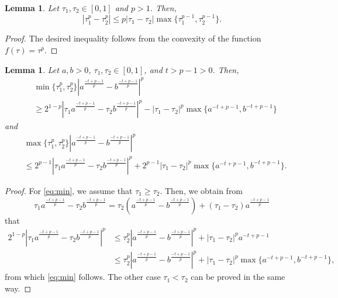 \documentclass[11pt]{amsart}
\theoremstyle{plain}
\newtheorem{lemma}[theorem]{Lemma}
\theoremstyle{definition}
\numberwithin{equation}{section}
\begin{document}
\begin{appendix}
\begin{lemma} \label{lem:ineq3}
Let $\tau_1, \tau_2 \in [0,1]$ and $p > 1$. Then,
\begin{equation*}
|\tau_1^p - \tau_2^p| \leq p |\tau_1-\tau_2| \max\lbrace \tau_1^{p-1},\tau_2^{p-1} \rbrace.
\end{equation*}
\end{lemma}

\begin{proof}
The desired inequality follows from the convexity of the function $f(\tau) = \tau^p$.
\end{proof}

\begin{lemma} \label{lem:ineq4}
Let $a, b > 0$, $\tau_1, \tau_2 \in [0,1]$, and $t > p-1 > 0$. Then,
\begin{equation} \label{eq:min}
\begin{split}
&\min\lbrace \tau_1^p, \tau_2^p \rbrace \left| a^{\frac{-t+p-1}{p}} - b^{\frac{-t+p-1}{p}} \right|^p \\
&\geq 2^{1-p} \left| \tau_1 a^{\frac{-t+p-1}{p}} - \tau_2 b^{\frac{-t+p-1}{p}} \right|^p - |\tau_1-\tau_2|^p \max \lbrace a^{-t+p-1}, b^{-t+p-1} \rbrace
\end{split}
\end{equation}
and
\begin{equation} \label{eq:max}
\begin{split}
&\max\lbrace \tau_1^p, \tau_2^p \rbrace \left| a^{\frac{-t+p-1}{p}} - b^{\frac{-t+p-1}{p}} \right|^p \\
&\leq 2^{p-1} \left| \tau_1 a^{\frac{-t+p-1}{p}} - \tau_2 b^{\frac{-t+p-1}{p}} \right|^p + 2^{p-1} |\tau_1-\tau_2|^p \max \lbrace a^{-t+p-1}, b^{-t+p-1} \rbrace.
\end{split}
\end{equation}
\end{lemma}

\begin{proof}
For \eqref{eq:min}, we assume that $\tau_1 \geq \tau_2$. Then, we obtain from
\begin{equation*}
\tau_1 a^{\frac{-t+p-1}{p}} - \tau_2 b^{\frac{-t+p-1}{p}} = \tau_2 \left( a^{\frac{-t+p-1}{p}} - b^{\frac{-t+p-1}{p}} \right) + (\tau_1-\tau_2) a^{\frac{-t+p-1}{p}}
\end{equation*}
that
\begin{equation*}
\begin{split}
2^{1-p} \left| \tau_1 a^{\frac{-t+p-1}{p}} - \tau_2 b^{\frac{-t+p-1}{p}} \right|^p 
&\leq \tau_2^p \left|a^{\frac{-t+p-1}{p}} - b^{\frac{-t+p-1}{p}}\right|^p + |\tau_1-\tau_2|^p a^{-t+p-1} \\
&\leq \tau_2^p \left|a^{\frac{-t+p-1}{p}} - b^{\frac{-t+p-1}{p}}\right|^p + |\tau_1-\tau_2|^p \max \lbrace a^{-t+p-1}, b^{-t+p-1} \rbrace,
\end{split}
\end{equation*}
from which \eqref{eq:min} follows. The other case $\tau_1 < \tau_2$ can be proved in the same way.


\end{proof}
\end{appendix}
\end{document}
